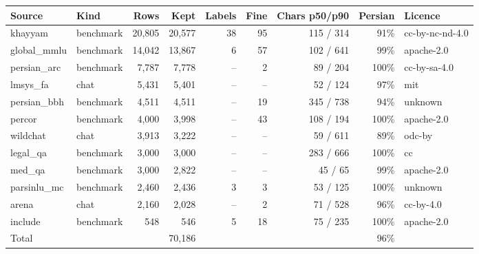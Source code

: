 \begin{tabular}{llrrrrrrl}
\toprule
Source & Kind & Rows & Kept & Labels & Fine & Chars p50/p90 & Persian & Licence \\
\midrule
khayyam & benchmark & 20,805 & 20,577 & 38 & 95 & 115 / 314 & 91\% & cc-by-nc-nd-4.0 \\
global\_mmlu & benchmark & 14,042 & 13,867 & 6 & 57 & 102 / 641 & 99\% & apache-2.0 \\
persian\_arc & benchmark & 7,787 & 7,778 & -- & 2 & 89 / 204 & 100\% & cc-by-sa-4.0 \\
lmsys\_fa & chat & 5,431 & 5,401 & -- & -- & 52 / 124 & 97\% & mit \\
persian\_bbh & benchmark & 4,511 & 4,511 & -- & 19 & 345 / 738 & 94\% & unknown \\
percor & benchmark & 4,000 & 3,998 & -- & 43 & 108 / 194 & 100\% & apache-2.0 \\
wildchat & chat & 3,913 & 3,222 & -- & -- & 59 / 611 & 89\% & odc-by \\
legal\_qa & benchmark & 3,000 & 3,000 & -- & -- & 283 / 666 & 100\% & cc \\
med\_qa & benchmark & 3,000 & 2,822 & -- & -- & 45 / 65 & 99\% & apache-2.0 \\
parsinlu\_mc & benchmark & 2,460 & 2,436 & 3 & 3 & 53 / 125 & 100\% & unknown \\
arena & chat & 2,160 & 2,028 & -- & 2 & 71 / 528 & 96\% & cc-by-4.0 \\
include & benchmark & 548 & 546 & 5 & 18 & 75 / 235 & 100\% & apache-2.0 \\
\midrule
Total & & & 70,186 & & & & 96\% & \\
\bottomrule
\end{tabular}

